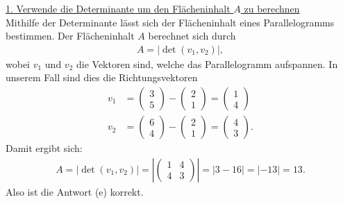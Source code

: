 \underline{1. Verwende die Determinante um den Flächeninhalt $ A $ zu berechnen}\\
Mithilfe der Determinante lässt sich der Flächeninhalt eines Parallelogramms bestimmen. Der Flächeninhalt $ A $ berechnet sich durch
\begin{align*}
	A = | \det (v_1,v_2) |, 
\end{align*}
wobei $ v_1 $ und $ v_2 $ die Vektoren sind, welche das Parallelogramm aufspannen. In unserem Fall sind dies die Richtungsvektoren
\begin{align*}
	v_1 &= 
	\begin{pmatrix}
		3\\
		5
	\end{pmatrix}
	-\begin{pmatrix}
	2 \\ 1
	\end{pmatrix}
	=
	\begin{pmatrix}
		1\\4
	\end{pmatrix}\\
	v_2 &=
	\begin{pmatrix}
		6\\
		4
	\end{pmatrix}
	-\begin{pmatrix}
		2 \\ 1
	\end{pmatrix}
	=
	\begin{pmatrix}
		4\\3
	\end{pmatrix}.
\end{align*}
Damit ergibt sich:
\begin{align*}
	A = | \det (v_1,v_2) |
	= \left|
	\begin{pmatrix}
		1 & 4 \\
		4 & 3
	\end{pmatrix}
	\right|
	= | 3 - 16 | = | -13 |
	= 13.
\end{align*}
Also ist die Antwort (e) korrekt.



\newpage

